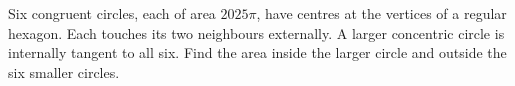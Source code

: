 Six congruent circles, each of area $2025\pi$, have centres at the vertices of a regular hexagon. Each touches its two neighbours externally. A larger concentric circle is internally tangent to all six. Find the area inside the larger circle and outside the six smaller circles.
